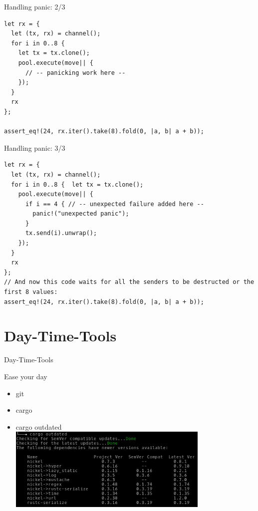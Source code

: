 \documentclass[aspectratio=1610,t]{beamer}
\begin{document}
\begin{frame}[fragile]{Handling panic: 2/3}
  \begin{verbatim}
let rx = {
  let (tx, rx) = channel();
  for i in 0..8 {
    let tx = tx.clone();
    pool.execute(move|| {
      // -- panicking work here --
    });
  }
  rx
};

assert_eq!(24, rx.iter().take(8).fold(0, |a, b| a + b));
  \end{verbatim}
\end{frame}
\begin{frame}[fragile]{Handling panic: 3/3}
  \begin{verbatim}
let rx = {
  let (tx, rx) = channel();
  for i in 0..8 {  let tx = tx.clone();
    pool.execute(move|| {
      if i == 4 { // -- unexpected failure added here --
        panic!("unexpected panic");
      }
      tx.send(i).unwrap();
    });
  }
  rx
};
// And now this code waits for all the senders to be destructed or the first 8 values:
assert_eq!(24, rx.iter().take(8).fold(0, |a, b| a + b));
  \end{verbatim}
\end{frame}

{
\section{Day-Time-Tools}
}
\begin{frame}[fragile]{Day-Time-Tools}

Ease your day

\begin{itemize}[<+- | alert@+>]
  \item git
  \item cargo 
  \item cargo outdated \\ \includegraphics[height=4cm]{cargo_outdated.png}
\end{itemize}

\end{frame}
\end{document}
